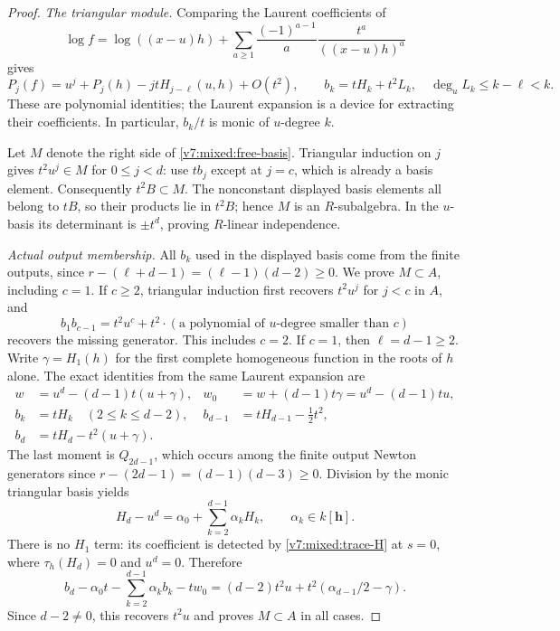 \documentclass[10pt,fleqn]{article}
\numberwithin{equation}{section}
\begin{document}
\begin{proof}
\textit{The triangular module.}
Comparing the Laurent coefficients of
\[
 \log f=\log((x-u)h)+
 \sum_{a\ge1}\frac{(-1)^{a-1}}a\frac{t^a}{((x-u)h)^a}
\]
gives
\begin{equation}\label{v7:mixed:triangular-moments}
 P_j(f)=u^j+P_j(h)-jtH_{j-\ell}(u,h)+O(t^2),\qquad
 b_k=tH_k+t^2L_k,\quad\deg_u L_k\le k-\ell<k.
\end{equation}
These are polynomial identities; the Laurent expansion is a device for
extracting their coefficients.  In particular, $b_k/t$ is monic of
$u$-degree $k$.

Let $M$ denote the right side of \eqref{v7:mixed:free-basis}.
Triangular induction on $j$ gives $t^2u^j\in M$ for $0\le j<d$:
use $tb_j$ except at $j=c$, which is already a basis element.
Consequently $t^2B\subset M$.  The nonconstant displayed basis elements
all belong to $tB$, so their products lie in $t^2B$; hence $M$ is an
$R$-subalgebra.  In the $u$-basis its determinant is $\pm t^d$, proving
$R$-linear independence.

\textit{Actual output membership.}
All $b_k$ used in the displayed basis come from
the finite outputs, since
$r-(\ell+d-1)=(\ell-1)(d-2)\ge0$.
We prove $M\subset A$, including $c=1$.
If $c\ge2$, triangular induction first recovers $t^2u^j$ for $j<c$ in
$A$, and
\[
 b_1b_{c-1}=t^2u^c+t^2\cdot
          (\text{a polynomial of $u$-degree smaller than }c)
\]
recovers the missing generator.  This includes $c=2$.
If $c=1$, then $\ell=d-1\ge2$.  Write $\gamma=H_1(h)$ for the first
complete homogeneous function in the roots of $h$ alone.  The exact
identities from the same Laurent expansion are
\begin{align*}
 w&=u^d-(d-1)t(u+\gamma),&
 w_0&=w+(d-1)t\gamma=u^d-(d-1)tu,\\
 b_k&=tH_k\quad(2\le k\le d-2),&
 b_{d-1}&=tH_{d-1}-\tfrac12t^2,\\
 b_d&=tH_d-t^2(u+\gamma).&&
\end{align*}
The last moment is $Q_{2d-1}$, which occurs among
the finite output Newton generators since
$r-(2d-1)=(d-1)(d-3)\ge0$.
Division by the monic triangular basis yields
\[
 H_d-u^d=\alpha_0+\sum_{k=2}^{d-1}\alpha_kH_k,
       \qquad\alpha_k\in k[\mathbf h].
\]
There is no $H_1$ term: its coefficient is detected by
\eqref{v7:mixed:trace-H} at $s=0$, where $\tau_h(H_d)=0$ and
$u^d=0$.  Therefore
\[
 b_d-\alpha_0t-\sum_{k=2}^{d-1}\alpha_kb_k-tw_0
 =(d-2)t^2u+t^2(\alpha_{d-1}/2-\gamma).
\]
Since $d-2\ne0$, this recovers $t^2u$ and proves $M\subset A$ in all cases.


\end{proof}
\end{document}
